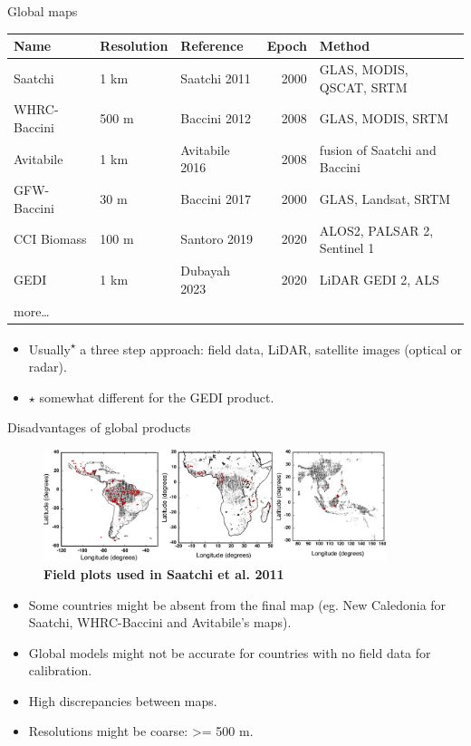 \documentclass[10pt,table,dvipsnames,compress]{beamer}
\begin{document}
\begin{frame}[label={sec:org7e299fc}]{Global maps}
\begin{center}
\footnotesize
\begin{tabular}{lllrl}
Name & Resolution & Reference & Epoch & Method\\[0pt]
\hline
Saatchi & 1 km & Saatchi 2011 & 2000 & GLAS, MODIS, QSCAT, SRTM\\[0pt]
WHRC-Baccini & 500 m & Baccini 2012 & 2008 & GLAS, MODIS, SRTM\\[0pt]
Avitabile & 1 km & Avitabile 2016 & 2008 & fusion of Saatchi and Baccini\\[0pt]
GFW-Baccini & 30 m & Baccini 2017 & 2000 & GLAS, Landsat, SRTM\\[0pt]
CCI Biomass & 100 m & Santoro 2019 & 2020 & ALOS2, PALSAR 2, Sentinel 1\\[0pt]
GEDI & 1 km & Dubayah 2023 & 2020 & LiDAR GEDI 2, ALS\\[0pt]
more\ldots{} &  &  &  & \\[0pt]
\end{tabular}
\end{center}

\begin{itemize}
\item Usually\textsuperscript{\(\star\)} a three step approach: field data, LiDAR, satellite images (optical or radar).
\item \(\star\) somewhat different for the GEDI product.
\end{itemize}
\end{frame}

\begin{frame}[label={sec:orge89f697}]{Disadvantages of global products}
\begin{figure}[htbp]
\centering
\includegraphics[width=10cm]{figs/carbon/data-saatchi.png}
\caption{\textbf{Field plots used in Saatchi et al. 2011}}
\end{figure}

\begin{itemize}
\item Some countries might be absent from the final map (eg. New Caledonia for Saatchi, WHRC-Baccini and Avitabile's maps).
\item Global models might not be accurate for countries with no field data for calibration.
\item High discrepancies between maps.
\item Resolutions might be coarse: >= 500 m.
\end{itemize}
\end{frame}
\end{document}
